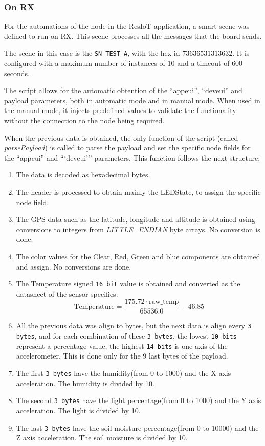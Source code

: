 \subsubsection*{On RX}
For the automations of the node in the ResIoT application, a smart scene was defined to run on RX. This scene processes all the messages that the board sends.

The scene in this case is the \texttt{SN\_TEST\_A}, with the hex id $73636531313632$. It is configured with a maximum number of instances of $10$ and a timeout of $600$ seconds.

The script allows for the automatic obtention of the ``appeui'', ``deveui'' and payload parameters, both in automatic mode and in manual mode. When used in the manual mode, it injects 
predefined values to validate the functionality without the connection to the node being required.

When the previous data is obtained, the only function of the script (called \textit{parsePayload}) is called to parse the payload and set the specific node fields for the ``appeui'' and ```deveui''' parameters. This function follows the next structure:
\begin{enumerate}
    \item The data is decoded as hexadecimal bytes.
    \item The header is processed to obtain mainly the LEDState, to assign the specific node field.
    \item The GPS data such as the latitude, longitude and altitude is obtained using conversions to integers from \textit{LITTLE\_ENDIAN} byte arrays. No conversion is done.
    \item The color values for the Clear, Red, Green and blue components are obtained and assign. No conversions are done.
    \item The Temperature signed \texttt{16 bit} value is obtained and converted as the datasheet of the sensor specifies\cite{Support_Documents_TechnicalDocs_Si7021A20}:
    \[
    \text{Temperature} = \frac{175.72 \cdot \text{raw\_temp}}{65536.0} - 46.85
    \]
    \item All the previous data was align to bytes, but the next data is align every \texttt{3 bytes}, and for each combination of these \texttt{3 bytes}, the lowest \texttt{10 bits} represent a percentage value, the highest \texttt{14 bits} is one axis of the accelerometer. This is done only for the 9 last bytes of the payload.
    \item The first \texttt{3 bytes} have the humidity(from 0 to 1000) and the X axis acceleration. The humidity is divided by 10.
    \item The second \texttt{3 bytes} have the light percentage(from 0 to 1000) and the Y axis acceleration. The light is divided by 10.
    \item The last \texttt{3 bytes} have the soil moisture percentage(from 0 to 10000) and the Z axis acceleration. The soil moisture is divided by 10.
\end{enumerate}

